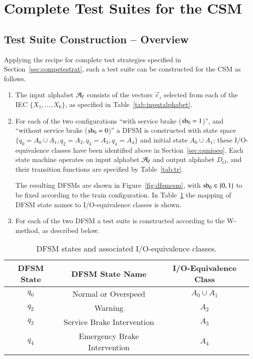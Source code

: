 \section{Complete Test Suites for the CSM}\label{sec:completesuites}


\subsection{Test Suite Construction -- Overview}
Applying the recipe for complete test strategies specified in Section~\ref{sec:competestrat}, such a test suite can be constructed for the CSM as follows.
\begin{enumerate}
\item The input alphabet ${\cal A}_I$ consists of the vectors $\vec c_i$ selected from each of the IEC $\{X_1,\dots,X_6\}$, as specified in Table~\ref{tab:inputalphabet}.

\item For each of the two configurations ``with service brake ($\text{sb}_0 = 1$)'', and ``without service brake ($\text{sb}_0 = 0$)'' a DFSM is constructed with state space $\{q_0 = A_0\cup A_1,q_2 = A_2,q_3 = A_3,q_4 = A_4\}$ and initial state
$A_0\cup A_1$; these I/O-equivalence classes have been identified above in 
Section~\ref{sec:csmioeq}. 
Each state machine operates on input alphabet ${\cal A}_I$ and output alphabet $D_O$, and their transition functions are specified by Table~\ref{tab:tr}.

The resulting DFSMs are  shown in Figure~\ref{fig:dfsmcsm}, with $\text{sb}_0 \in \{0,1\}$ to be fixed according to the train configuration. In Table~\ref{tab:AandMinDFSM} the mapping of DFSM state names to I/O-equivalence classes is shown.

\item For each of the two DFSM a test suite is constructed according to the W-method, as described below.
\end{enumerate}

\begin{table}[htdp]
\caption{DFSM states and associated I/O-equivalence classes.}
\begin{center}
\footnotesize
\begin{tabular}{|c|c|c|}
\hline\hline
{\bf DFSM State} & {\bf DFSM State Name} & {\bf I/O-Equivalence Class}
\\\hline\hline
$q_0$ & {\sf Normal or Overspeed} & $A_0\cup A_1$ 
\\\hline
$q_2$ & {\sf Warning} & $A_2$ 
\\\hline
$q_3$ & {\sf Service Brake Intervention} & $A_3$ 
\\\hline
$q_4$ & {\sf Emergency Brake Intervention} & $A_4$ 
\\\hline\hline
\end{tabular}
\normalsize
\end{center}
\label{tab:AandMinDFSM}
\end{table}%

